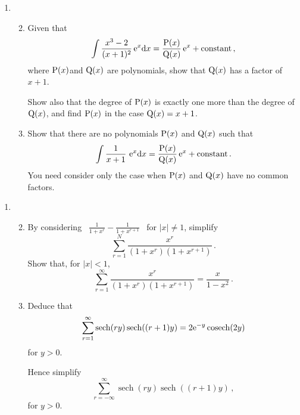 \documentclass[a4, 11pt]{report}
\newlength{\qspace}
\newcounter{qnumber}
\newenvironment{question}%
 {\vspace{\qspace}
  \begin{enumerate}[\bfseries 1\quad][10]%
    \setcounter{enumi}{\value{qnumber}}%
    \item%
 }
{
  \end{enumerate}
  \filbreak
  \stepcounter{qnumber}
 }
\newenvironment{questionparts}[1][1]%
 {
  \begin{enumerate}[\bfseries (i)]%
    \setcounter{enumii}{#1}
    \addtocounter{enumii}{-1}
    \setlength{\itemsep}{5mm}
    \setlength{\parskip}{8pt}
 }
 {
  \end{enumerate}
 }
\DeclareMathOperator{\cosech}{cosech}
\DeclareMathOperator{\sech}{sech}
\def\d{{\rm d}}
\def\e{{\rm e}}
\def\P{{\rm P}}
\def\Q{{\rm Q}}
\begin{document}
\begin{question}
\begin{questionparts}
\item
Given that 
\[
\int 
\frac {x^3-2}{(x+1)^2}\, \e ^x \d x = 
\frac{\P(x)}{\Q(x)}\,\e^x + \text{constant}
\,,
\]
 where $\P(x)$and $\Q(x)$ are polynomials,
show that
$\Q(x)$
has a factor of $x + 1$. 

Show also that
the degree of $\P(x)$ is exactly one more than the degree of $\Q(x)$,
and  find $\P(x)$ in the case $\Q(x) =x+1$.


\item
Show that there are no  polynomials $\P(x)$ and $\Q(x)$
such that 
\[
\int \frac 1 {x+1} \, \, \e^x \d x 
=
\frac{\P(x)}{\Q(x)}\,\e^x +\text{constant}
\,.
\]
You need consider only the case when $\P(x)$ and $\Q(x)$ 
have no common factors. 
\end{questionparts}






\end{question}





\begin{question}
\begin{questionparts}
\item
By considering
\ $\displaystyle
\frac1
{1+ x^r} 
-
\frac1
{1+ x^{r +1}}
$ 
\ for $\vert x \vert \ne 1$, 
simplify
\[
\sum_{r=1}^N
\frac{x^r}{(1+x^r)(1+x^{r+1})}
\,.
\]
Show that, for $\vert x \vert <1$,
\[
\sum_{r=1}^\infty
\frac{x^r}{(1+x^r)(1+x^{r+1})}
=
\frac x {1-x^2}
\,.
\]

\item
Deduce     that
\[
\sum_{r=1}^\infty
\sech(ry)\sech((r +  1)y) = 2\e^{-y} \cosech (2 y)
\]
 for $y > 0$.



Hence simplify  
\[
\sum_{r=-\infty}^\infty  \sech(ry) \sech((r + 1)y) 
\,,\]
for $y>0$.
\end{questionparts}


\end{question}
\end{document}
